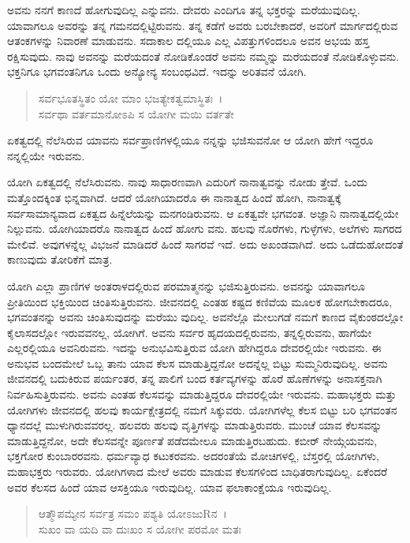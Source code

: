 ಅವನು ನನಗೆ ಕಾಣದೆ ಹೋಗುವುದಿಲ್ಲ ಎನ್ನುವನು. ದೇವರು ಎಂದಿಗೂ ತನ್ನ ಭಕ್ತರನ್ನು ಮರೆಯುವುದಿಲ್ಲ. ಯಾವಾಗಲೂ ಅವರನ್ನು ತನ್ನ ಗಮನದಲ್ಲಿಟ್ಟಿರುವನು. ತನ್ನ ಕಡೆಗೆ ಅವರು ಬರಬೇಕಾದರೆ, ಅವರಿಗೆ ಮಾರ್ಗದಲ್ಲಿರುವ ಆತಂಕಗಳನ್ನು ನಿವಾರಣೆ ಮಾಡುವನು. ಸದಾಕಾಲ ದಲ್ಲಿಯೂ ಎಲ್ಲ ವಿಪತ್ತುಗಳಿಂದಲೂ ಅವನ ಅಭಯ ಹಸ್ತ ರಕ್ಷಿಸುವುದು. ನಾವು ಅವನನ್ನು ಮರೆಯದಂತೆ ನೋಡಿಕೊಂಡರೆ ಅವನು ನಮ್ಮನ್ನು ಮರೆಯದಂತೆ ನೋಡಿಕೊಳ್ಳುವನು. ಭಕ್ತನಿಗೂ ಭಗವಂತನಿಗೂ ಒಂದು ಅನ್ಯೋನ್ಯ ಸಂಬಂಧವಿದೆ. ಇದನ್ನು ಅರಿತವನೆ ಯೋಗಿ.

\begin{verse}
ಸರ್ವಭೂತಸ್ಥಿತಂ ಯೋ ಮಾಂ ಭಜತ್ಯೇಕತ್ವಮಾಸ್ಥಿತಃ~।\\ಸರ್ವಥಾ ವರ್ತಮಾನೋಽಪಿ ಸ ಯೋಗೀ ಮಯಿ ವರ್ತತೇ 
\end{verse}

{\small ಏಕತ್ವದಲ್ಲಿ ನೆಲೆಸಿರುವ ಯಾವನು ಸರ್ವಪ್ರಾಣಿಗಳಲ್ಲಿಯೂ ನನ್ನನ್ನು ಭಜಿಸುವನೋ ಆ ಯೋಗಿ ಹೇಗೆ ಇದ್ದರೂ ನನ್ನಲ್ಲಿಯೇ ಇರುವನು.}

ಯೋಗಿ ಏಕತ್ವದಲ್ಲಿ ನೆಲೆಸಿರುವನು. ನಾವು ಸಾಧಾರಣವಾಗಿ ಎದುರಿಗೆ ನಾನಾತ್ವವನ್ನು ನೋಡು ತ್ತೇವೆ. ಒಂದು ಮತ್ತೊಂದಕ್ಕಿಂತ ಭಿನ್ನವಾಗಿದೆ. ಆದರೆ ಯೋಗಿಯಾದರೊ ಈ ನಾನಾತ್ವದ ಹಿಂದೆ ಹೋಗಿ, ನಾನಾತ್ವಕ್ಕೆ ಸರ್ವಸಾಮಾನ್ಯವಾದ ಏಕತ್ವದ ಹಿನ್ನೆಲೆಯನ್ನು ಮನಗಂಡಿರುವನು. ಆ ಏಕತ್ವವೇ ಭಗವಂತ. ಅಜ್ಞಾನಿ ನಾನಾತ್ವದಲ್ಲಿಯೇ ನಿಲ್ಲುವನು. ಯೋಗಿಯಾದರೊ ನಾನಾತ್ವದ ಹಿಂದೆ ಹೋಗು ವನು. ಹಲವು ನೊರೆಗಳು, ಗುಳ್ಳೆಗಳು, ಅಲೆಗಳು ಸಾಗರದ ಮೇಲಿವೆ. ಅವುಗಳನ್ನೆಲ್ಲ ವಿಭಜನೆ ಮಾಡಿದರೆ ಹಿಂದೆ ಸಾಗರವೆ ಇದೆ. ಅದು ಅಖಂಡವಾಗಿದೆ. ಅದು ಒಡೆದುಹೋದಂತೆ ಕಾಣುವುದು ತೋರಿಕೆಗೆ ಮಾತ್ರ.

ಯೋಗಿ ಎಲ್ಲಾ ಪ್ರಾಣಿಗಳ ಅಂತರಾಳದಲ್ಲಿರುವ ಪರಮಾತ್ಮನನ್ನು ಭಜಿಸುತ್ತಿರುವನು. ಅವನನ್ನು ಯಾವಾಗಲೂ ಪ್ರೀತಿಯಿಂದ ಭಕ್ತಿಯಿಂದ ಚಿಂತಿಸುತ್ತಿರುವನು. ಜೀವನದಲ್ಲಿ ಎಂತಹ ಕಷ್ಟದ ಕಣಿವೆಯ ಮೂಲಕ ಹೋಗಬೇಕಾದರೂ, ಭಗವಂತನನ್ನು ಅವನು ಚಿಂತಿಸುವುದನ್ನು ಮರೆಯು ವುದಿಲ್ಲ. ಅವನೆಲ್ಲೊ ಮೇಲುಗಡೆ ನಮಗೆ ಕಾಣದ ವೈಕುಂಠದಲ್ಲೋ ಕೈಲಾಸದಲ್ಲೋ ಇರುವವನಲ್ಲ, ಯೋಗಿಗೆ. ಅವನು ಸರ್ವರ ಹೃದಯದಲ್ಲಿರುವನು, ತನ್ನಲ್ಲಿರುವನು, ಹಾಗೆಯೇ ಎಲ್ಲರಲ್ಲಿಯೂ ಅವನಿರುವನು. ಇದನ್ನು ಅನುಭವಿಸುತ್ತಿರುವ ಯೋಗಿ ಹೇಗಿದ್ದರೂ ದೇವರಲ್ಲಿಯೇ ಇರುವನು. ಈ ಅನುಭವ ಬಂದಮೇಲೆ ಒಬ್ಬ ತಾನು ಯಾವ ಕೆಲಸ ಮಾಡುತ್ತಿದ್ದನೋ ಅದನ್ನೆಲ್ಲ ಬಿಟ್ಟು ಸುಮ್ಮನಿರುವುದಿಲ್ಲ. ಅವನು ಜೀವನದಲ್ಲಿ ಬದುಕಿರುವ ಪರ್ಯಂತರ, ತನ್ನ ಪಾಲಿಗೆ ಬಂದ ಕರ್ತವ್ಯಗಳನ್ನು ಹೊರೆ ಹೊಣೆಗಳನ್ನು ಅನಾಸಕ್ತನಾಗಿ ನಿರ್ವಹಿಸುತ್ತಿರುವನು. ಅವನು ಎಂತಹ ಕೆಲಸವನ್ನು ಮಾಡುತ್ತಿದ್ದರೂ ದೇವರಲ್ಲಿಯೇ ಇರುವನು. ಮಹಾಭಕ್ತರು ಮತ್ತು ಯೋಗಿಗಳು ಜೀವನದಲ್ಲಿ ಹಲವು ಕಾರ್ಯಕ್ಷೇತ್ರದಲ್ಲಿ ನಮಗೆ ಸಿಕ್ಕುವರು. ಯೋಗಿಗಳೆಲ್ಲ ಕೆಲಸ ಬಿಟ್ಟು ಬರಿ ಭಗವಂತನ ಧ್ಯಾನದಲ್ಲೆ ಮುಳುಗಿರುವವರಲ್ಲ. ಹಲವರು ಹಲವು ವೃತ್ತಿಗಳನ್ನು ಮಾಡುತ್ತಿರುವರು. ಮುಂಚೆ ಯಾವ ಕೆಲಸವನ್ನು ಮಾಡುತ್ತಿದ್ದನೋ, ಅದೇ ಕೆಲಸವನ್ನೇ ಪೂರ್ಣತೆ ಪಡೆದಮೇಲೂ ಮಾಡುತ್ತಿರಬಹುದು. ಕಬೀರ್ ನೇಯ್ಗೆಯವನು, ಭಕ್ತಗೋರ ಕುಂಬಾರರವನು. ಧರ್ಮವ್ಯಾಧ ಕಟುಕರವನು. ಅದರಂತೆಯೆ ಮೋಚಿಗಳಲ್ಲಿ, ಬೆಸ್ತರಲ್ಲಿ ಯೋಗಿಗಳು, ಮಹಾಭಕ್ತರು ಇರುವರು. ಯೋಗಿಗಳಾದ ಮೇಲೆ ಅವರು ಮಾಡುವ ಕೆಲಸಗಳಿಂದ ಬಾಧಿತರಾಗುವುದಿಲ್ಲ. ಏಕೆಂದರೆ ಅವರ ಕೆಲಸದ ಹಿಂದೆ ಯಾವ ಆಸಕ್ತಿಯೂ ಇರುವುದಿಲ್ಲ. ಯಾವ ಫಲಾಕಾಂಕ್ಷೆಯೂ ಇರುವುದಿಲ್ಲ.

\begin{verse}
ಆತ್ಮೌಪಮ್ಯೇನ ಸರ್ವತ್ರ ಸಮಂ ಪಶ್ಯತಿ ಯೋಽಜುRನ~।\\ಸುಖಂ ವಾ ಯದಿ ವಾ ದುಃಖಂ ಸ ಯೋಗೀ ಪರಮೋ ಮತಃ 
\end{verse}


